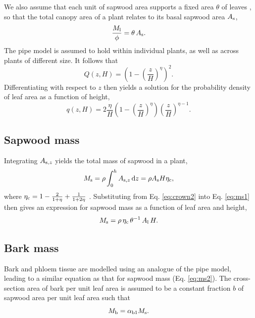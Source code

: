 \documentclass[10pt,twoside]{article}
\begin{document}
We also assume that each unit of sapwood area supports a fixed area \(\theta\) of
leaves \citep[in agreement with the pipe model;][]{Shinozaki-1964}, so that the total canopy
area of a plant relates to its basal sapwood area \(A_{\rm s}\),
\begin{equation}\label{eq:crown2}
\frac{M_{\rm l}}{\phi} = \theta \, A_{\rm s}.
\end{equation}
The pipe model is assumed to hold within individual plants, as well as
across plants of different size. It follows that
\begin{equation}\label{eq:crown1}
Q(z, H) = \left(1-\left(\frac{z}{H}\right)^\eta\right)^2.
\end{equation}
Differentiating with respect to \(z\) then yields a solution for the
probability density of leaf area as a function of height,
\begin{equation}\label{eq:crown3}
q(z, H) = 2\frac{\eta}{H}\left(1-\left(\frac{z}{H}\right)^{\eta}\right) \left(\frac{z}{H}\right)^{\eta-1}.
\end{equation}

\subsection{Sapwood mass}\label{mass-of-sapwood}

Integrating \(A_{{\rm s},z}\) yields the total mass of
sapwood in a plant,
\begin{equation}\label{eq:ms1}
M_{\rm s}  = \rho \int_0^h A_{{\rm s},z} \, {\rm d}z = \rho A_{\rm s} H \eta_{\rm c} ,
\end{equation}
where \(\eta_{\rm c} = 1 - \frac{2}{1 + \eta} + \frac{1}{1 + 2\eta}\)
\citep{Yokozawa-1995}. Substituting from Eq. \ref{eq:crown2}  into Eq.
\ref{eq:ms1} then gives an expression for sapwood mass as a function of
leaf area and height,
\begin{equation}\label{eq:ms2}
M_{\rm s} = \rho \, \eta_{\rm c} \, \theta^{-1} \, A_{\rm l}  \, H.
\end{equation}

\subsection{Bark mass}\label{bark-mass}

Bark and phloem tissue are modelled using an analogue of the pipe model,
leading to a similar equation as that for sapwood mass (Eq.
\ref{eq:ms2}). The cross-section area of bark per unit leaf area is
assumed to be a constant fraction \(b\) of sapwood area per unit leaf
area such that
\begin{equation}\label{eq:mb}
M_{\rm b} = \alpha_{{\rm b1}} M_{\rm s}.
\end{equation}
\end{document}
